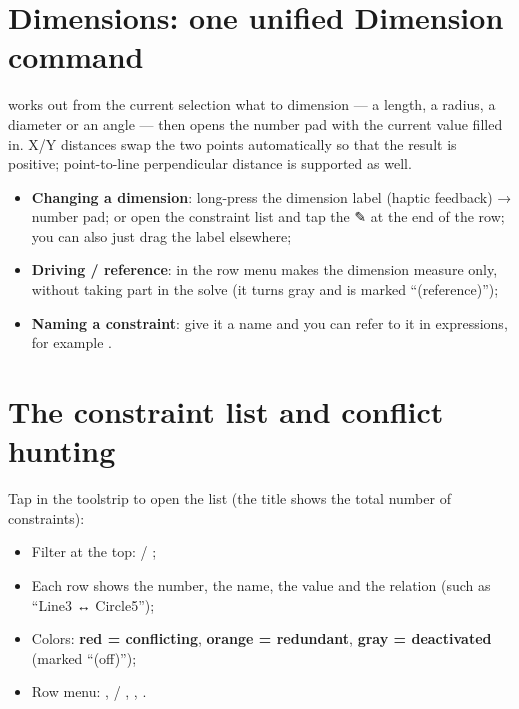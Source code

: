 \section{Dimensions: one unified Dimension command}

 works out from the current selection what to dimension --- a length, a radius, a diameter or an
angle --- then opens the number pad with the current value filled in. X/Y distances swap the two points automatically so
that the result is positive; point-to-line perpendicular distance is supported as well.

\begin{itemize}
  \item \textbf{Changing a dimension}: long-press the dimension label (haptic feedback) → number pad; or open the
        constraint list and tap the ✎ at the end of the row; you can also just drag the label elsewhere;
  \item \textbf{Driving / reference}:  in the row menu makes the dimension measure only,
        without taking part in the solve (it turns gray and is marked ``(reference)'');
  \item \textbf{Naming a constraint}: give it a name and you can refer to it in expressions, for example
        .
\end{itemize}

\section{The constraint list and conflict hunting}

Tap  in the toolstrip to open the list (the title shows the total number of constraints):

\begin{itemize}
  \item Filter at the top:  / ;
  \item Each row shows the number, the name, the value and the relation (such as ``Line3 ↔ Circle5'');
  \item Colors: \textbf{red = conflicting}, \textbf{orange = redundant}, \textbf{gray = deactivated} (marked ``(off)'');
  \item Row menu: ,  / , , .
\end{itemize}

